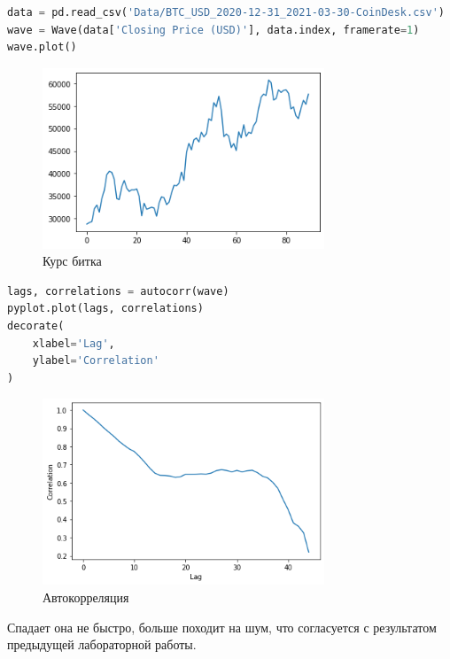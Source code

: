 \documentclass[a4paper,12pt]{report}
\begin{document}
\begin{lstlisting}[language=Python,caption=Загрузка датасета]
data = pd.read_csv('Data/BTC_USD_2020-12-31_2021-03-30-CoinDesk.csv')
wave = Wave(data['Closing Price (USD)'], data.index, framerate=1)
wave.plot()
\end{lstlisting}

    \begin{figure}[H]
        \centering
        \includegraphics[width=0.75\textwidth]{images/ex3_wave.png}
        \caption{Курс битка}
        \label{fig:ex3_wave}
    \end{figure}
    
\begin{lstlisting}[language=Python,caption=Автокорреляция]
lags, correlations = autocorr(wave)
pyplot.plot(lags, correlations)
decorate(
    xlabel='Lag',
    ylabel='Correlation'
)
\end{lstlisting}

    \begin{figure}[H]
        \centering
        \includegraphics[width=0.75\textwidth]{images/ex3_autocorr.png}
        \caption{Автокорреляция}
        \label{fig:ex3_autocorr}
    \end{figure}
    
    Спадает она не быстро, больше походит на  шум, что согласуется с результатом предыдущей лабораторной работы.
    
\end{document}
